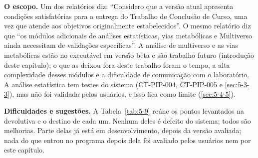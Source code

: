 \textbf{O escopo.} Um dos relatórios diz: ``Considero que a versão atual apresenta condições satisfatórias para a entrega do Trabalho de Conclusão de Curso, uma vez que atende aos objetivos originalmente estabelecidos''. O mesmo relatório diz que ``os módulos adicionais de análises estatísticas, vias metabólicas e Multiverso ainda necessitam de validações específicas''. A análise de multiverso e as vias metabólicas estão no executável em versão beta e são trabalho futuro (introdução deste capítulo); o que as deixou fora deste trabalho foram o tempo, a alta complexidade desses módulos e a dificuldade de comunicação com o laboratório. A análise estatística tem testes do sistema (CT-PIP-004, CT-PIP-005 e \ref{sec:5-3-3}), mas não foi validada pelos usuários, e isso fica como limite (\ref{sec:5-4-5}).

\textbf{Dificuldades e sugestões.} A Tabela~\ref{tab:5-9} reúne os pontos levantados na devolutiva e o destino de cada um. Nenhum deles é defeito do sistema; todos são melhorias. Parte delas já está em desenvolvimento, depois da versão avaliada; nada do que entrou no programa depois dela foi avaliado pelos usuários nem por este capítulo.

